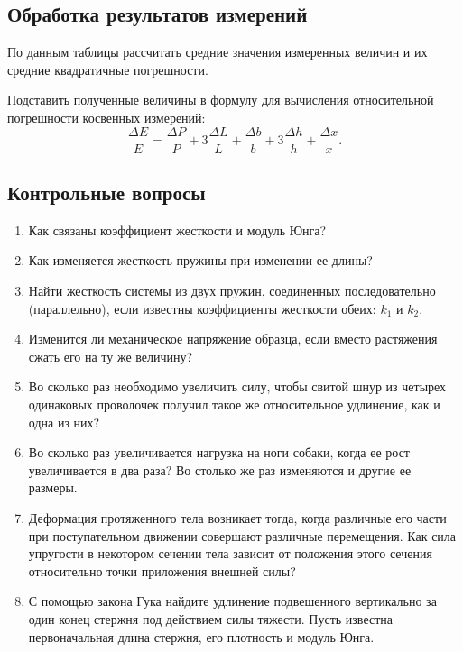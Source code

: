 \documentclass[a4paper, 12pt]{extarticle}
\begin{document}
\subsection{Обработка результатов измерений}
По данным таблицы рассчитать средние значения измеренных величин и их средние квадратичные погрешности. 

Подставить полученные величины в формулу для вычисления относительной погрешности косвенных измерений: 
\[ %
\frac{\Delta E}{E} = \frac{\Delta P}{P} + 3\frac{\Delta L}{L} + \frac{\Delta b}{b} + 3\frac{\Delta h}{h} + \frac{\Delta x}{x}.
\]

\subsection{Контрольные вопросы}
\begin{enumerate}
\item Как связаны коэффициент жесткости и модуль Юнга?
\item Как изменяется жесткость пружины при изменении ее длины?
\item Найти жесткость системы из двух  пружин, соединенных последовательно (параллельно), если известны коэффициенты жесткости обеих: $k_1$ и $k_2$.
\item Изменится ли механическое напряжение образца, если вместо растяжения сжать его на ту же величину?
\item Во сколько раз необходимо увеличить силу, чтобы свитой шнур из четырех одинаковых проволочек получил такое же относительное удлинение, как и одна из них?
\item Во сколько раз увеличивается нагрузка на ноги собаки, когда ее рост увеличивается в два раза? Во столько же раз  изменяются и другие ее размеры.
\item Деформация протяженного тела возникает тогда, когда различные его части при поступательном движении совершают различные перемещения. Как сила упругости в некотором сечении тела зависит от положения этого сечения относительно точки приложения внешней силы?
\item С помощью закона Гука найдите удлинение подвешенного вертикально за один конец стержня под действием силы тяжести. Пусть известна первоначальная длина стержня, его плотность и модуль Юнга.
\end{enumerate}
\end{document}
